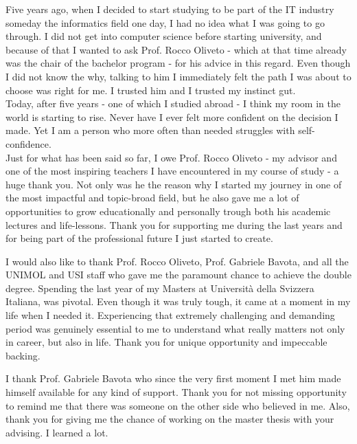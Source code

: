 \begin{acknowledgements}

\addchaptertocentry{\acknowledgementname}
Five years ago, when I decided to start studying to be part of the IT industry someday the informatics field one day, 
I had no idea what I was going to go through. 
I did not get into computer science before starting university, and because of that 
I wanted to ask Prof. Rocco Oliveto - which at that time already was the chair of the bachelor program - for his advice 
in this regard. Even though I did not know the why, talking to him I immediately felt the path I was about to choose was right for me. 
I trusted him and I trusted my instinct gut. \\
Today, after five years - one of which I studied abroad - I think my room in the world is starting to rise.
Never have I ever felt more confident on the decision I made. Yet I am a person who more often than needed struggles with self-confidence.\\

Just for what has been said so far, I owe Prof. Rocco Oliveto - my advisor and one of the most inspiring teachers I have encountered
in my course of study - a huge thank you. Not only was he the reason why I started my journey in one of the most impactful and topic-broad field, 
but he also gave me a lot of opportunities to grow educationally and personally trough both his academic lectures and life-lessons.
Thank you for supporting me during the last years and for being part of the professional future I just started to create.

I would also like to thank Prof. Rocco Oliveto, Prof. Gabriele Bavota, and all the UNIMOL and USI staff who gave me the paramount chance to 
achieve the double degree. 
Spending the last year of my Masters at Università della Svizzera Italiana, was pivotal. Even though it was
truly tough, it came at a moment in my life when I needed it. 
Experiencing that extremely challenging and demanding 
period was genuinely essential to me to understand what really matters not only in career, but also in life. Thank you 
for unique opportunity and impeccable backing.

I thank Prof. Gabriele Bavota who since the very first moment I met him made himself available for any kind of support. 
Thank you for not missing opportunity to remind me that there was someone on the other side who believed in me. Also, thank you 
for giving me the chance of working on the master thesis with your advising. I learned a lot.


\end{acknowledgements}
